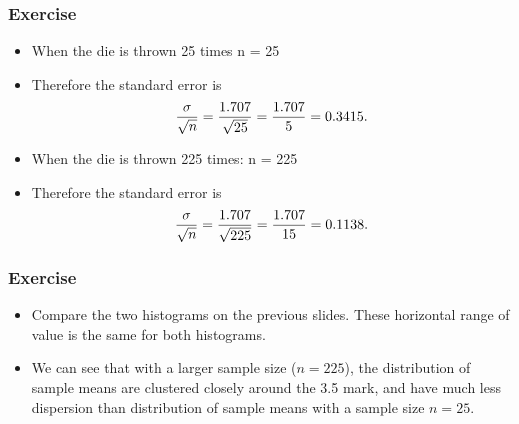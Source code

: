 \documentclass[a4]{beamer}
\begin{document}
\begin{frame}
\frametitle{Exercise}
\begin{itemize}
\item When the die is thrown 25 times n = 25
\item Therefore the standard error is
\[ {\sigma \over \sqrt{n}}  = {1.707 \over \sqrt{25}} = {1.707 \over 5} = 0.3415. \]
\item When the die is thrown 225 times: n = 225
\item Therefore the standard error is
\[ {\sigma \over \sqrt{n}}  = {1.707 \over \sqrt{225}} = {1.707 \over 15} = 0.1138. \]

\end{itemize}
\end{frame}


\begin{frame}
\frametitle{Exercise}
\begin{itemize}
\item Compare the two histograms on the previous slides. These horizontal range of value is the same for both histograms.

\item We can see that with a larger sample size ($n=225$), the distribution of sample means are clustered closely around the 3.5 mark, and have much less dispersion than distribution of sample means with a sample size $n=25$.

\end{itemize}
\end{frame}
\end{document}
